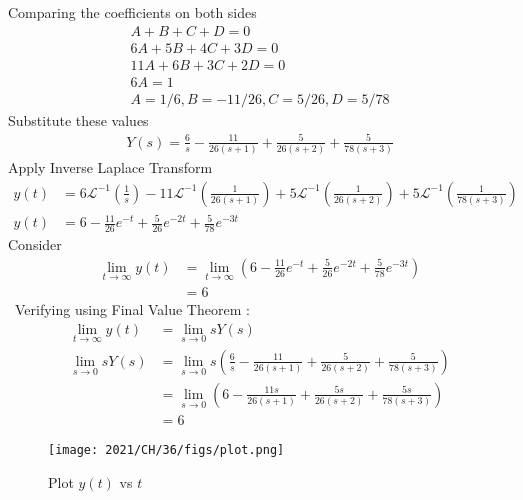 \documentclass[journal,12pt,onecolumn]{IEEEtran}
\theoremstyle{remark}
\renewcommand{\brak}[1]{\left(#1\right)}
\begin{document}
Comparing the coefficients on both sides \\
\begin{align}
A + B + C + D = 0 \\
6A + 5B + 4C + 3D = 0 \\
11A + 6B + 3C + 2D = 0 \\
6A = 1 \\
A=1/6 ,B = -11/26 , C= 5/26 , D= 5/78 
\end{align}
Substitute these values 
\begin{align}
Y(s) = \frac{6}{s} - \frac{11}{26\brak{s+1}} + \frac{5}{26\brak{s+2}} + \frac{5}{78\brak{s+3}}
\end{align}
Apply Inverse Laplace Transform 
\begin{align}
y(t) &= 6\mathcal{L}^{-1}\brak{\frac{1}{s}} - 11\mathcal{L}^{-1}\brak{\frac{1}{26\brak{s+1}}} + 5\mathcal{L}^{-1}\brak{\frac{1}{26\brak{s+2}}} + 5\mathcal{L}^{-1}\brak{\frac{1}{78\brak{s+3}}} \\
y(t) &= 6 - \frac{11}{26}e^{-t} + \frac{5}{26}e^{-2t} +\frac{5}{78}e^{-3t}
\end{align}
Consider
\begin{align}
\lim_{t \to \infty} y(t) &= \lim_{t \to \infty} \brak{6 - \frac{11}{26}e^{-t} + \frac{5}{26}e^{-2t} +\frac{5}{78}e^{-3t}} \\
&= 6
\end{align}\
Verifying using Final Value Theorem :\\
\begin{align}
 \lim_{t \to \infty} y(t)   &= \lim_{s \to 0} sY(s)  \\
\lim_{s \to 0} sY(s) &= \lim_{s \to 0} s \brak{ \frac{6}{s} - \frac{11}{26\brak{s+1}} + \frac{5}{26\brak{s+2}} + \frac{5}{78\brak{s+3}}} \\
&= \lim_{s \to 0} \brak{ 6 - \frac{11s}{26\brak{s+1}} + \frac{5s}{26\brak{s+2}} + \frac{5s}{78\brak{s+3}}} \\
&= 6
\end{align}

\begin{figure}[h!]
\centering
\texttt{[image: 2021/CH/36/figs/plot.png]}
\caption{Plot $y(t)$ vs $t$ }
\end{figure}
\end{document}
